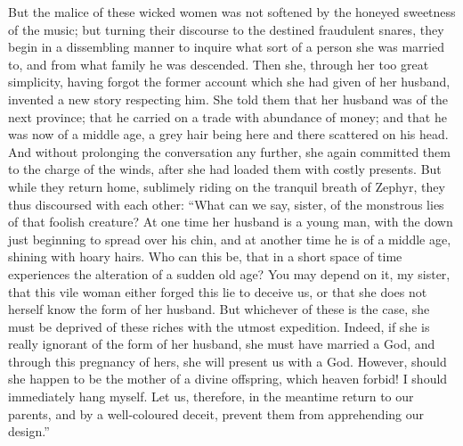 \documentclass[12pt]{article}
\begin{document}
But the malice of these wicked women was not softened by the honeyed sweetness
of the music; but turning their discourse to the destined fraudulent snares,
they begin in a dissembling manner to inquire what sort of a person she was
married to, and from what family he was descended. Then she, through her too
great simplicity, having forgot the former account which she had given of her
husband, invented a new story respecting him. She told them that her husband
was of the next province; that he carried on a trade with abundance of money;
and that he was now of a middle age, a grey hair being here and there scattered
on his head. And without prolonging the conversation any further, she again
committed them to the charge of the winds, after she had loaded them with
costly presents. But while they return home, sublimely riding on the tranquil
breath of Zephyr, they thus discoursed with each other: ``What can we say,
sister, of the monstrous lies of that foolish creature? At one time her husband
is a young man, with the down just beginning to spread over his chin, and at
another time he is of a middle age, shining with hoary hairs. Who can this be,
that in a short space of time experiences the alteration of a sudden old age?
You may depend on it, my sister, that this vile woman either forged this lie to
deceive us, or that she does not herself know the form of her husband. But
whichever of these is the case, she must be deprived of these riches with the
utmost expedition. Indeed, if she is really ignorant of the form of her
husband, she must have married a God, and through this pregnancy of hers, she
will present us with a God. However, should she happen to be the mother of a
divine offspring, which heaven forbid! I should immediately hang myself. Let
us, therefore, in the meantime return to our parents, and by a well-coloured
deceit, prevent them from apprehending our design.''
\end{document}
